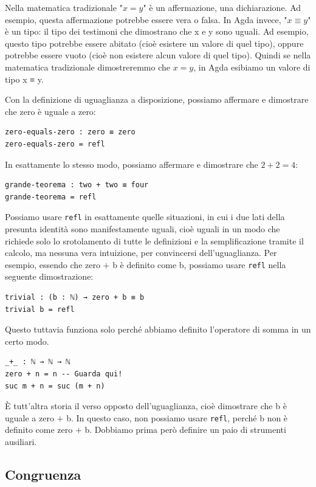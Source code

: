 \documentclass[a4paper]{article}
\theoremstyle{definition}
\theoremstyle{remark}
\begin{document}
\begin{Observation}{}{}
  Nella matematica tradizionale "$x=y$" è un affermazione, una dichiarazione. Ad esempio, questa affermazione potrebbe essere vera o falsa. In Agda invece, "$x ≡ y$" è un tipo: il tipo dei testimoni che dimostrano che x e y sono uguali. Ad esempio, questo tipo potrebbe essere abitato (cioè esistere un valore di quel tipo), oppure potrebbe essere vuoto (cioè non esistere alcun valore di quel tipo).
 Quindi se nella matematica tradizionale dimostreremmo che $x=y$, in Agda esibiamo un valore di tipo x ≡ y.  
\end{Observation}
\noindent
Con la definizione di uguaglianza a disposizione, possiamo affermare e dimostrare che zero è uguale a zero:
\begin{verbatim}
zero-equals-zero : zero ≡ zero
zero-equals-zero = refl
\end{verbatim}
\noindent
In esattamente lo stesso modo, possiamo affermare e dimostrare che $2+2=4$:
\begin{verbatim}
grande-teorema : two + two ≡ four
grande-teorema = refl
\end{verbatim}
Possiamo usare \texttt{refl} in esattamente quelle situazioni, in cui i due lati della presunta identità sono manifestamente uguali, cioè uguali in un modo che richiede solo lo srotolamento di tutte le definizioni e la semplificazione tramite il calcolo, ma nessuna vera intuizione, per convincersi dell'uguaglianza.
Per esempio, essendo che zero $+$ b è definito come b, possiamo usare \texttt{refl} nella seguente dimostrazione:
\begin{verbatim}
trivial : (b : ℕ) → zero + b ≡ b
trivial b = refl
\end{verbatim}
Questo tuttavia funziona solo perché abbiamo definito l'operatore di somma in un certo modo.
\begin{verbatim}
_+_ : ℕ → ℕ → ℕ
zero + n = n -- Guarda qui!
suc m + n = suc (m + n)
\end{verbatim}
È tutt'altra storia il verso opposto dell'uguaglianza, cioè dimostrare che b è uguale a zero $+$ b.
In questo caso, non possiamo usare \texttt{refl}, perché b non è definito come zero $+$ b.
Dobbiamo prima però definire un paio di strumenti ausiliari.

\subsection{Congruenza}
\end{document}
